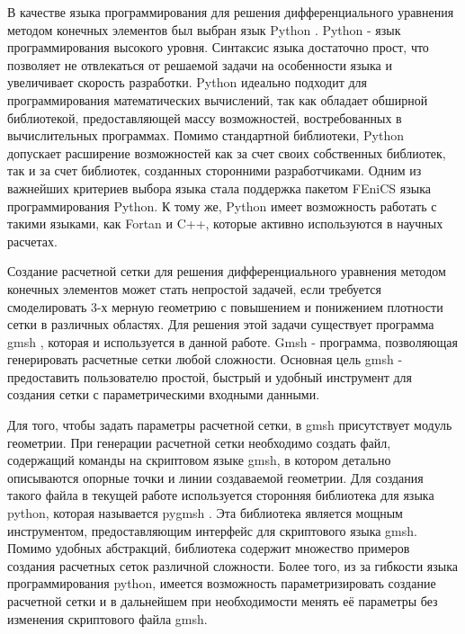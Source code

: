 В качестве языка программирования для решения дифференциального уравнения методом конечных элементов был выбран язык 
Python \cite{python_lutz}. Python - язык программирования высокого уровня. Синтаксис языка достаточно прост, что 
позволяет не отвлекаться от решаемой задачи на особенности языка и увеличивает скорость разработки. Python идеально 
подходит для программирования математических вычислений, так как обладает обширной библиотекой, предоставляющей массу 
возможностей, востребованных в вычислительных программах. Помимо стандартной библиотеки, Python допускает расширение 
возможностей как за счет своих собственных библиотек, так и за счет библиотек, созданных сторонними разработчиками. 
Одним из важнейших критериев выбора языка стала поддержка пакетом FEniCS языка программирования Python. К тому же, 
Python имеет возможность работать с такими языками, как Fortan и C++, которые активно используются в научных расчетах.

Создание расчетной сетки для решения дифференциального уравнения методом конечных элементов может стать непростой 
задачей, если требуется смоделировать 3-х мерную геометрию с повышением и понижением плотности сетки в различных 
областях. Для решения этой задачи существует программа gmsh \cite{gmsh_man}, которая и используется в данной работе.
Gmsh - программа, позволяющая генерировать расчетные сетки любой сложности. Основная цель gmsh - предоставить 
пользователю простой, быстрый и удобный инструмент для создания сетки с параметрическими входными данными.

Для того, чтобы задать параметры расчетной сетки, в gmsh присутствует модуль геометрии. При генерации расчетной сетки 
необходимо создать файл, содержащий команды на скриптовом языке gmsh, в котором детально описываются опорные точки и 
линии создаваемой геометрии. Для создания такого файла в текущей работе используется сторонняя библиотека для языка 
python, которая называется pygmsh \cite{pygmsh_doc}. Эта библиотека является мощным инструментом, предоставляющим 
интерфейс для скриптового языка gmsh. Помимо удобных абстракций, библиотека содержит множество примеров создания 
расчетных сеток различной сложности. Более того, из за гибкости языка программирования python, имеется возможность 
параметризировать создание расчетной сетки и в дальнейшем при необходимости менять её параметры без изменения скриптового 
файла gmsh.